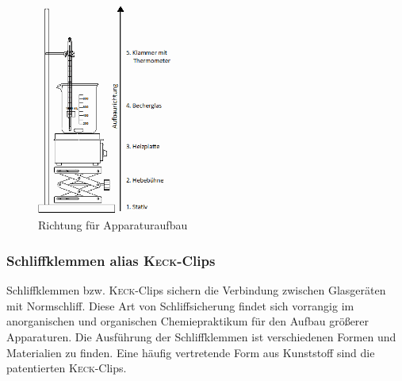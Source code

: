 \begin{figure}[h!]
	\centering
	\includegraphics[width=0.4\textwidth]{img/Grundaufbau_Apparatur.png}
	\caption{Richtung für Apparaturaufbau}
\end{figure}
\FloatBarrier

\subsubsection{Schliffklemmen alias \textsc{Keck}-Clips}
Schliffklemmen bzw. \textsc{Keck}-Clips sichern die Verbindung zwischen Glasgeräten mit Normschliff. Diese Art von Schliffsicherung findet sich vorrangig im anorganischen und organischen Chemiepraktikum für den Aufbau größerer Apparaturen. Die Ausführung der Schliffklemmen ist verschiedenen Formen und Materialien zu finden. Eine häufig vertretende Form aus Kunststoff  sind die patentierten \textsc{Keck}-Clips.

